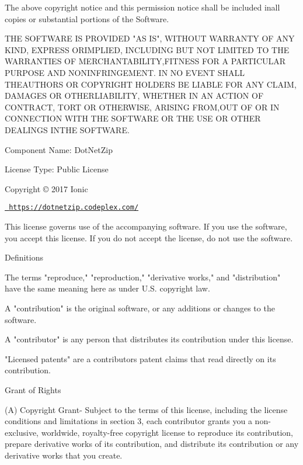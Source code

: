 The above copyright notice and this permission notice shall be included inall copies or substantial portions of the Software.

THE SOFTWARE IS PROVIDED "{}\+AS IS"{}, WITHOUT WARRANTY OF ANY KIND, EXPRESS ORIMPLIED, INCLUDING BUT NOT LIMITED TO THE WARRANTIES OF MERCHANTABILITY,FITNESS FOR A PARTICULAR PURPOSE AND NONINFRINGEMENT. IN NO EVENT SHALL THEAUTHORS OR COPYRIGHT HOLDERS BE LIABLE FOR ANY CLAIM, DAMAGES OR OTHERLIABILITY, WHETHER IN AN ACTION OF CONTRACT, TORT OR OTHERWISE, ARISING FROM,OUT OF OR IN CONNECTION WITH THE SOFTWARE OR THE USE OR OTHER DEALINGS INTHE SOFTWARE.

 Component Name\+: Dot\+Net\+Zip

License Type\+:  Public License

Copyright © 2017 Ionic

\href{https://dotnetzip.codeplex.com/}{\texttt{ https\+://dotnetzip.\+codeplex.\+com/}}

This license governs use of the accompanying software. If you use the software, you accept this license. If you do not accept the license, do not use the software.


\begin{DoxyEnumerate}
\item Definitions
\end{DoxyEnumerate}

The terms "{}reproduce,"{} "{}reproduction,"{} "{}derivative works,"{} and "{}distribution"{} have the same meaning here as under U.\+S. copyright law.

A "{}contribution"{} is the original software, or any additions or changes to the software.

A "{}contributor"{} is any person that distributes its contribution under this license.

"{}\+Licensed patents"{} are a contributor\textquotesingle{}s patent claims that read directly on its contribution.


\begin{DoxyEnumerate}
\item Grant of Rights
\end{DoxyEnumerate}

(A) Copyright Grant-\/ Subject to the terms of this license, including the license conditions and limitations in section 3, each contributor grants you a non-\/exclusive, worldwide, royalty-\/free copyright license to reproduce its contribution, prepare derivative works of its contribution, and distribute its contribution or any derivative works that you create.

